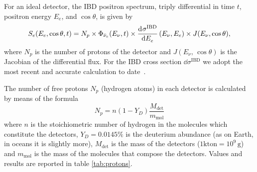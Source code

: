 \documentclass[a4paper,11pt]{article}
\begin{document}

For an ideal detector, the IBD positron spectrum, triply differential in time $t$, positron energy $E_e$, and $\cos \theta$, is given by
\begin{equation}
    S_e(E_e, \cos{\theta}, t)=N_p \times \Phi_{\bar{\nu}_e}(E_{\nu},t)\times \dv[]{\sigma^{\text{IBD}}}{E_e}\,(E_{\nu},E_e)\times J(E_\nu,\cos{\theta}),
\end{equation}
where $N_p$ is the number of protons of the detector
 and $J(E_{\nu},\,\cos{\theta})$ is the Jacobian of the differential flux.
% 
For the IBD cross section $\dd \sigma^{\text{IBD}}$ we adopt the most recent and accurate calculation to date~\cite{Ricciardi:2022pru}.



The number of free protons $N_p$ (hydrogen atoms) in each detector is calculated by means of the formula
\begin{equation}
N_p = n(1 - Y_D) \frac{M_{\text{det}}}{m_{\text{mol}}}
\end{equation}
where \( n \) is the stoichiometric number of hydrogen in the molecules which constitute the detectors,
\( Y_D = 0.0145\% \) is the deuterium abundance (as on Earth, in oceans it is slightly more), \( M_{\text{det}} \) is the mass of the detectors ($1 \mbox{kton} =  10^9 \, \text{g}$) and 
\( m_{\text{mol}} \) is the mass of the molecules that compose the detectors.
Values and results are reported in table \ref{tab:protons}.
\end{document}
